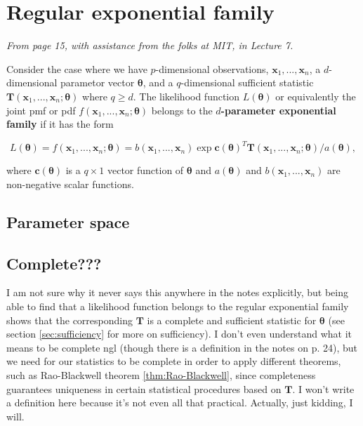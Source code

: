 \section{Regular exponential family}\label{sec:reg exp fam}

\textit{From page 15, with assistance from the folks at MIT, \autocite{MIT} in Lecture 7.}

Consider the case where we have \(p\)-dimensional observations, \(\bm{x}_1,...,\bm{x}_n\), 
a \(d\)-dimensional parametor vector \(\bm{\theta}\), 
and a \(q\)-dimensional sufficient statistic \(\bm{T}(\bm{x}_1,...,\bm{x}_n;\bm{\theta})\) where \(q\geq d\). 
The likelihood function \(L(\bm{\theta})\) or equivalently the joint 
pmf or pdf \(f(\bm{x}_1,...,\bm{x}_n;\bm{\theta})\) belongs to the 
\textbf{\(d\)-parameter exponential family} if it has the form

\begin{equation}\label{eq:exp family}
    L(\bm{\theta}) = f(\bm{x}_1,...,\bm{x}_n;\bm{\theta}) = b(\bm{x}_1,...,\bm{x}_n)\exp{\bm{c}(\bm{\theta})^T \bm{T}(\bm{x}_1,...,\bm{x}_n;\bm{\theta})/a(\bm{\theta})},
\end{equation}

where \(\bm{c}(\bm{\theta})\) is a \(q\times 1\) vector function of \(\bm{\theta}\) and \(a(\bm{\theta})\) and \(b(\bm{x}_1,...,\bm{x}_n)\) 
are non-negative scalar functions. 







\subsection{Parameter space}\label{sec:parameter space}




\subsection{Complete???}\label{sec:complete}

I am not sure why it never says this anywhere in the notes explicitly, but being able to find that a likelihood function belongs to the regular exponential family shows that the corresponding \(\bm{T}\) is a complete and sufficient statistic for \(\bm{\theta}\) (see section \ref{sec:sufficiency} for more on sufficiency). 
I don't even understand what it means to be complete ngl (though there is a definition in the notes on p. 24), but we need for our statistics to be complete in order to apply different theorems, such as Rao-Blackwell theorem \ref{thm:Rao-Blackwell}, since completeness guarantees uniqueness in certain statistical procedures based on \(\bm{T}\).
I won't write a definition here because it's not even all that practical. Actually, just kidding, I will.


